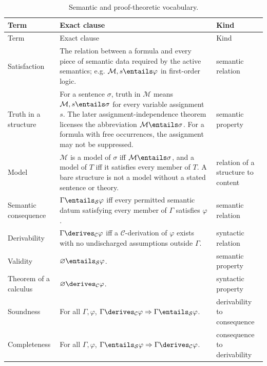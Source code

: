 \begingroup\small
\begin{longtable}{@{}p{}p{}p{}@{}}
\caption{Semantic and proof-theoretic vocabulary.}
\label{tab:p01-consequence-vocabulary}\\
\toprule
Term & Exact clause & Kind \\
\midrule
\endfirsthead
\toprule
Term & Exact clause & Kind \\
\midrule
\endhead
Satisfaction\index{satisfaction} & The relation between a formula and every
piece of semantic data required by the active semantics; e.g.
\(\mathcal M,s\entails\varphi\) in first-order logic. & semantic relation \\
Truth in a structure\index{truth!in a structure} & For a sentence
\(\sigma\), truth in \(\mathcal M\) means
\(\mathcal M,s\entails\sigma\) for every variable assignment \(s\).
The later assignment-independence theorem licenses the abbreviation
\(\mathcal M\entails\sigma\).  For a formula with free occurrences, the
assignment may not be suppressed. & semantic property \\
Model\index{model} & \(\mathcal M\) is a model of \(\sigma\) iff
\(\mathcal M\entails\sigma\), and a model of \(T\) iff it satisfies every
member of \(T\).  A bare structure is not a model without a stated sentence
or theory. & relation of a structure to content \\
Semantic consequence\index{semantic consequence} &
\(\Gamma\entails_{\mathcal S}\varphi\) iff every permitted semantic datum
satisfying every member of \(\Gamma\) satisfies \(\varphi\). & semantic
relation \\
Derivability\index{derivability} &
\(\Gamma\derives_{\mathcal C}\varphi\) iff a \(\mathcal C\)-derivation of
\(\varphi\) exists with no undischarged assumptions outside \(\Gamma\). &
syntactic relation \\
Validity\index{validity} & \(\varnothing\entails_{\mathcal S}\varphi\). &
semantic property \\
Theorem of a calculus\index{theorem!of a calculus} &
\(\varnothing\derives_{\mathcal C}\varphi\). & syntactic property \\
Soundness\index{soundness} & For all \(\Gamma,\varphi\),
\(\Gamma\derives_{\mathcal C}\varphi\Rightarrow
\Gamma\entails_{\mathcal S}\varphi\). & derivability to consequence \\
Completeness\index{completeness!of a calculus} & For all
\(\Gamma,\varphi\),
\(\Gamma\entails_{\mathcal S}\varphi\Rightarrow
\Gamma\derives_{\mathcal C}\varphi\). & consequence to derivability \\

\end{longtable}
